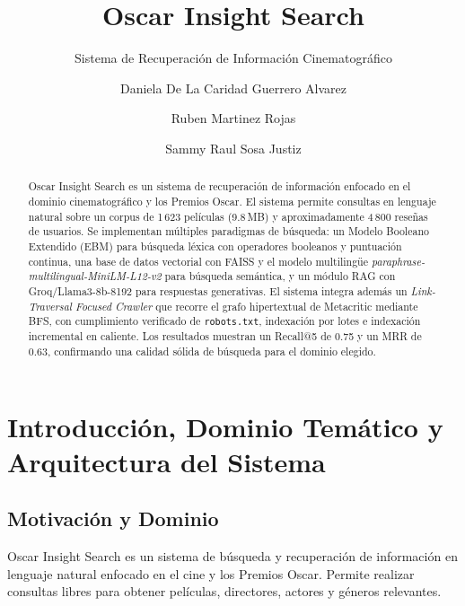 \documentclass[10pt,a4paper]{llncs}
\begin{document}
\title{Oscar Insight Search}
\subtitle{Sistema de Recuperación de Información Cinematográfico}

\author{Daniela De La Caridad Guerrero Alvarez \and
        Ruben Martinez Rojas \and
        Sammy Raul Sosa Justiz}


\maketitle

\begin{abstract}
Oscar Insight Search es un sistema de recuperación de información enfocado en el dominio cinematográfico y los Premios Oscar. El sistema permite consultas en lenguaje natural sobre un corpus de 1\,623 películas (9.8\,MB) y aproximadamente 4\,800 reseñas de usuarios. Se implementan múltiples paradigmas de búsqueda: un Modelo Booleano Extendido (EBM) para búsqueda léxica con operadores booleanos y puntuación continua, una base de datos vectorial con FAISS y el modelo multilingüe \textit{paraphrase-multilingual-MiniLM-L12-v2} para búsqueda semántica, y un módulo RAG con Groq/Llama3-8b-8192 para respuestas generativas. El sistema integra además un \textit{Link-Traversal Focused Crawler} que recorre el grafo hipertextual de Metacritic mediante BFS, con cumplimiento verificado de \texttt{robots.txt}, indexación por lotes e indexación incremental en caliente. Los resultados muestran un Recall@5 de 0.75 y un MRR de 0.63, confirmando una calidad sólida de búsqueda para el dominio elegido.
\end{abstract}


\section{Introducción, Dominio Temático y Arquitectura del Sistema}

\subsection{Motivación y Dominio}

Oscar Insight Search es un sistema de búsqueda y recuperación de información en lenguaje natural enfocado en el cine y los Premios Oscar. Permite realizar consultas libres para obtener películas, directores, actores y géneros relevantes.
\end{document}
